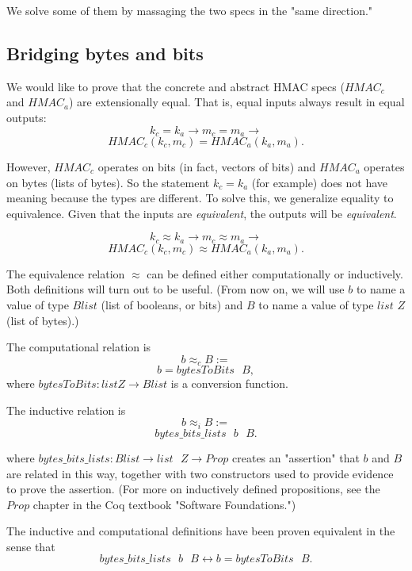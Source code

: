 \documentclass[twocolumn,showpacs,%
  nofootinbib,aps,superscriptaddress,%
  eqsecnum,prd,notitlepage,showkeys,10pt]{revtex4-1}
\begin{document}
We solve some of them by massaging the two specs in the "same direction."

\subsection{Bridging bytes and bits}

We would like to prove that the concrete and abstract HMAC specs ($HMAC_c$ and $HMAC_a$) are extensionally equal. That is, equal inputs always result in equal outputs: 
$$k_c = k_a \rightarrow
m_c = m_a \rightarrow$$ 
$$HMAC_c(k_c, m_c) = HMAC_a(k_a, m_a).$$

However, $HMAC_c$ operates on bits (in fact, vectors of bits) and $HMAC_a$ operates on bytes (lists of bytes). So the statement $k_c = k_a$ (for example) does not have meaning because the types are different. To solve this, we generalize equality to equivalence. Given that the inputs are {\it equivalent}, the outputs will be {\it equivalent}.

$$k_c \approx  k_a \rightarrow
m_c \approx m_a \rightarrow$$ 
$$HMAC_c(k_c, m_c) \approx HMAC_a(k_a, m_a).$$

The equivalence relation $\approx$ can be defined either computationally or inductively. Both definitions will turn out to be useful. (From now on, we will use $b$ to name a value of type $Blist$ (list of booleans, or bits) and $B$ to name a value of type $list$ $Z$ (list of bytes).)

The computational relation is 
$$b \approx_c B :=$$
$$b = bytesToBits \textrm{ } B,$$ where $bytesToBits : list \textrm{} Z \rightarrow Blist$ is a conversion function.

The inductive relation is 
$$b \approx_i B :=$$
$$bytes\_bits\_lists \textrm{ } b \textrm{ } B.$$

where $bytes\_bits\_lists : Blist \rightarrow list \textrm{ } Z \rightarrow Prop$ creates an "assertion" that $b$ and $B$ are related in this way, together with two constructors used to provide evidence to prove the assertion. (For more on inductively defined propositions, see the $Prop$ chapter in the Coq textbook "Software Foundations.")



The inductive and computational definitions have been proven equivalent in the sense that 
$$bytes\_bits\_lists \textrm{ } b \textrm{ } B \leftrightarrow b = bytesToBits \textrm{ } B.$$
\end{document}
